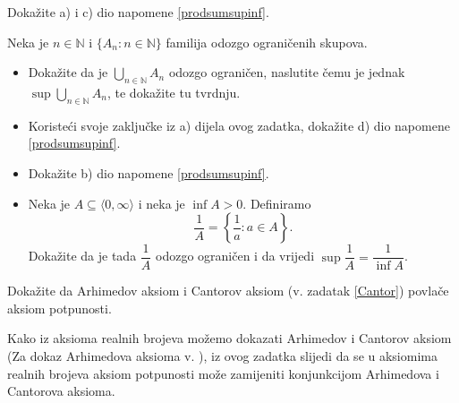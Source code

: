 \begin{exercise}{\unskip}
Dokažite a) i c) dio napomene \ref{prodsumsupinf}.
\end{exercise}
\begin{exercise}{\unskip}
Neka je $n\in \mathbb{N}$ i $\{A_n : n\in \mathbb{N}\}$ familija odozgo ograničenih skupova.
\begin{itemize}
\item[a)] Dokažite da je $\bigcup\limits_{n\in \mathbb{N}}A_n$ odozgo ograničen, naslutite čemu je jednak $\sup{\bigcup\limits_{n\in \mathbb{N}}A_n}$, te dokažite tu tvrdnju.
\item[b)] Koristeći svoje zaključke iz a) dijela ovog zadatka, dokažite d) dio napomene \ref{prodsumsupinf}.
\end{itemize}
\end{exercise}
\begin{exercise}{\unskip} \textbf{}
\begin{itemize}
\item[a)] Dokažite b) dio napomene \ref{prodsumsupinf}.
\item[b)] Neka je \(A\subseteq \langle 0,\infty\rangle\) i neka je \(\inf{A}>0\). Definiramo
\[\dfrac{1}{A}=\left\{\dfrac{1}{a} : a\in A\right\}.\]
Dokažite da je tada \(\dfrac{1}{A}\) odozgo ograničen i da vrijedi
\(\sup{\dfrac{1}{A}}=\dfrac{1}{\inf{A}}\).
\end{itemize}
\end{exercise}
\begin{exercise}{\unskip}
Dokažite da Arhimedov aksiom i Cantorov aksiom (v. zadatak \ref{Cantor}) povlače aksiom potpunosti.
\end{exercise}
\begin{remark}
Kako iz aksioma realnih brojeva možemo dokazati Arhimedov i Cantorov aksiom (Za dokaz Arhimedova aksioma v. \cite{3}), iz ovog zadatka slijedi da se u aksiomima realnih brojeva aksiom potpunosti može zamijeniti konjunkcijom Arhimedova i Cantorova aksioma.
\end{remark}
